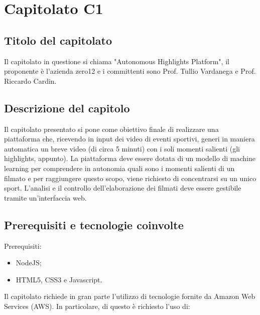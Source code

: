 \section{Capitolato C1}
\subsection{Titolo del capitolato}
Il capitolato in questione si chiama "Autonomous Highlights Platform", il proponente \`e l'azienda zero12 e i committenti sono Prof. Tullio Vardanega e Prof. Riccardo Cardin.

\subsection{Descrizione del capitolo}
Il capitolato presentato si pone come obiettivo finale di realizzare una piattaforma che, ricevendo in input dei video di eventi sportivi, generi in maniera automatica un breve video (di circa 5 minuti) con i soli momenti salienti (gli highlights, appunto).
La piattaforma deve essere dotata di un modello di machine learning per comprendere in autonomia quali sono i momenti salienti di un filmato e per raggiungere questo scopo, viene richiesto di concentrarsi su un unico sport.
L'analisi e il controllo dell'elaborazione dei filmati deve essere gestibile tramite un'interfaccia web.

\subsection{Prerequisiti e tecnologie coinvolte}
Prerequisiti:
\begin{itemize}
\item NodeJS;
\item HTML5, CSS3 e Javascript.
\end{itemize}
Il capitolato richiede in gran parte l'utilizzo di tecnologie fornite da Amazon Web Services (AWS).
In particolare, di questo \`e richiesto l'uso di:

